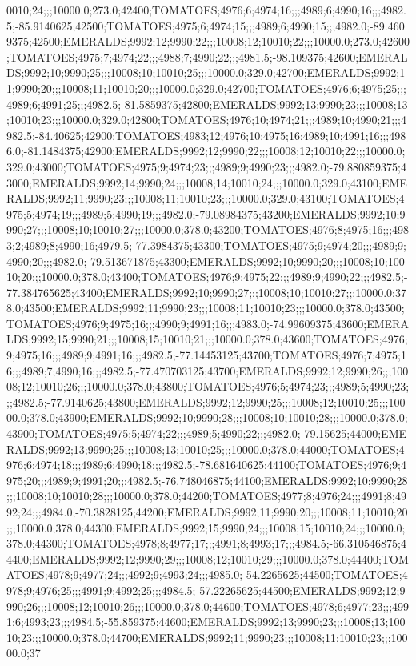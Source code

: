0010;24;;;10000.0;273.0;42400;TOMATOES;4976;6;4974;16;;;4989;6;4990;16;;;4982.5;-85.9140625;42500;TOMATOES;4975;6;4974;15;;;4989;6;4990;15;;;4982.0;-89.4609375;42500;EMERALDS;9992;12;9990;22;;;10008;12;10010;22;;;10000.0;273.0;42600;TOMATOES;4975;7;4974;22;;;4988;7;4990;22;;;4981.5;-98.109375;42600;EMERALDS;9992;10;9990;25;;;10008;10;10010;25;;;10000.0;329.0;42700;EMERALDS;9992;11;9990;20;;;10008;11;10010;20;;;10000.0;329.0;42700;TOMATOES;4976;6;4975;25;;;4989;6;4991;25;;;4982.5;-81.5859375;42800;EMERALDS;9992;13;9990;23;;;10008;13;10010;23;;;10000.0;329.0;42800;TOMATOES;4976;10;4974;21;;;4989;10;4990;21;;;4982.5;-84.40625;42900;TOMATOES;4983;12;4976;10;4975;16;4989;10;4991;16;;;4986.0;-81.1484375;42900;EMERALDS;9992;12;9990;22;;;10008;12;10010;22;;;10000.0;329.0;43000;TOMATOES;4975;9;4974;23;;;4989;9;4990;23;;;4982.0;-79.880859375;43000;EMERALDS;9992;14;9990;24;;;10008;14;10010;24;;;10000.0;329.0;43100;EMERALDS;9992;11;9990;23;;;10008;11;10010;23;;;10000.0;329.0;43100;TOMATOES;4975;5;4974;19;;;4989;5;4990;19;;;4982.0;-79.08984375;43200;EMERALDS;9992;10;9990;27;;;10008;10;10010;27;;;10000.0;378.0;43200;TOMATOES;4976;8;4975;16;;;4983;2;4989;8;4990;16;4979.5;-77.3984375;43300;TOMATOES;4975;9;4974;20;;;4989;9;4990;20;;;4982.0;-79.513671875;43300;EMERALDS;9992;10;9990;20;;;10008;10;10010;20;;;10000.0;378.0;43400;TOMATOES;4976;9;4975;22;;;4989;9;4990;22;;;4982.5;-77.384765625;43400;EMERALDS;9992;10;9990;27;;;10008;10;10010;27;;;10000.0;378.0;43500;EMERALDS;9992;11;9990;23;;;10008;11;10010;23;;;10000.0;378.0;43500;TOMATOES;4976;9;4975;16;;;4990;9;4991;16;;;4983.0;-74.99609375;43600;EMERALDS;9992;15;9990;21;;;10008;15;10010;21;;;10000.0;378.0;43600;TOMATOES;4976;9;4975;16;;;4989;9;4991;16;;;4982.5;-77.14453125;43700;TOMATOES;4976;7;4975;16;;;4989;7;4990;16;;;4982.5;-77.470703125;43700;EMERALDS;9992;12;9990;26;;;10008;12;10010;26;;;10000.0;378.0;43800;TOMATOES;4976;5;4974;23;;;4989;5;4990;23;;;4982.5;-77.9140625;43800;EMERALDS;9992;12;9990;25;;;10008;12;10010;25;;;10000.0;378.0;43900;EMERALDS;9992;10;9990;28;;;10008;10;10010;28;;;10000.0;378.0;43900;TOMATOES;4975;5;4974;22;;;4989;5;4990;22;;;4982.0;-79.15625;44000;EMERALDS;9992;13;9990;25;;;10008;13;10010;25;;;10000.0;378.0;44000;TOMATOES;4976;6;4974;18;;;4989;6;4990;18;;;4982.5;-78.681640625;44100;TOMATOES;4976;9;4975;20;;;4989;9;4991;20;;;4982.5;-76.748046875;44100;EMERALDS;9992;10;9990;28;;;10008;10;10010;28;;;10000.0;378.0;44200;TOMATOES;4977;8;4976;24;;;4991;8;4992;24;;;4984.0;-70.3828125;44200;EMERALDS;9992;11;9990;20;;;10008;11;10010;20;;;10000.0;378.0;44300;EMERALDS;9992;15;9990;24;;;10008;15;10010;24;;;10000.0;378.0;44300;TOMATOES;4978;8;4977;17;;;4991;8;4993;17;;;4984.5;-66.310546875;44400;EMERALDS;9992;12;9990;29;;;10008;12;10010;29;;;10000.0;378.0;44400;TOMATOES;4978;9;4977;24;;;4992;9;4993;24;;;4985.0;-54.2265625;44500;TOMATOES;4978;9;4976;25;;;4991;9;4992;25;;;4984.5;-57.22265625;44500;EMERALDS;9992;12;9990;26;;;10008;12;10010;26;;;10000.0;378.0;44600;TOMATOES;4978;6;4977;23;;;4991;6;4993;23;;;4984.5;-55.859375;44600;EMERALDS;9992;13;9990;23;;;10008;13;10010;23;;;10000.0;378.0;44700;EMERALDS;9992;11;9990;23;;;10008;11;10010;23;;;10000.0;37